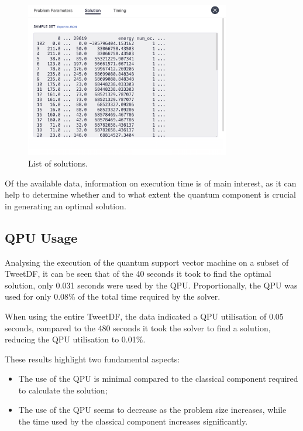 \begin{figure}
    \centering
    \includegraphics[width=0.8\textwidth]{figures/sampleset.png}
    \caption{List of solutions.}
    \label{fig:sampleset}
\end{figure}

Of the available data, information on execution time is of main interest, as it can help to determine whether and to what extent the quantum component is crucial in generating an optimal solution.

\subsection{QPU Usage}\label{sec:qpuusage}

Analysing the execution of the quantum support vector machine on a subset of TweetDF, it can be seen that of the 40 seconds it took to find the optimal solution, only 0.031 seconds were used by the QPU. Proportionally, the QPU was used for only 0.08\% of the total time required by the solver.

When using the entire TweetDF, the data indicated a QPU utilisation of 0.05 seconds, compared to the 480 seconds it took the solver to find a solution, reducing the QPU utilisation to 0.01\%.

These results highlight two fundamental aspects: 
\begin{itemize} 
	\item The use of the QPU is minimal compared to the classical component required to calculate the solution; 
	\item The use of the QPU seems to decrease as the problem size increases, while the time used by the classical component increases significantly. 
\end{itemize}

